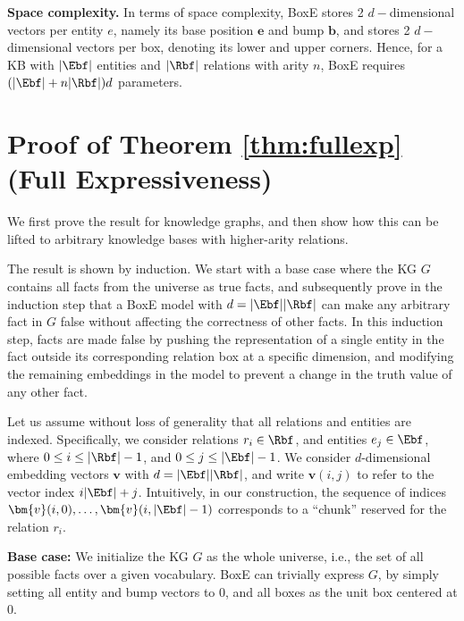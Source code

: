 \documentclass{article}
\begin{document}
\textbf{Space complexity.} In terms of space complexity, BoxE stores 2 $d-$dimensional vectors per entity $e$, namely its base position $\bm{e}$ and bump $\bm{b}$, and stores 2 $d-$dimensional vectors per box, denoting its lower and upper corners. Hence, for a KB with $|\Ebf|$ entities and $|\Rbf|$ relations with arity $n$, BoxE requires $(|\Ebf| + n|\Rbf|)d$ parameters.


\section{Proof of Theorem \ref{thm:fullexp} (Full Expressiveness)}
\label{app:fullExp}
We first prove the result for knowledge graphs, and then show how this can be lifted to arbitrary knowledge bases with higher-arity relations.


The result is shown by induction. We start with a base case where the KG $G$ contains all facts from  the universe as true facts, and subsequently prove in the induction step that a BoxE model with $d = |\Ebf||\Rbf|$ can make any arbitrary fact in $G$ false without affecting the correctness of other facts. In this induction step, facts are made false by pushing the representation of a single entity in the fact outside its corresponding relation box at a specific dimension, and modifying the remaining embeddings in the model to prevent a change in the truth value of any other fact. 


Let us assume without loss of generality that all relations and entities are indexed. Specifically, we consider relations $r_i \in \Rbf$, and entities $e_j \in \Ebf$, where $0\leq i \leq |\Rbf|-1$, and $0\leq j \leq |\Ebf|-1$.
We consider $d$-dimensional embedding vectors $\bm{v}$ with $d = |\Ebf||\Rbf|$, and write $\bm{v}(i,j)$ to refer to the vector index $i|\Ebf|+j$.
Intuitively, in our construction, the sequence of indices $\bm{v}(i,0), \ldots, \bm{v}(i,|\Ebf|-1)$  corresponds to 
a ``chunk'' reserved for the relation $r_i$.

\textbf{Base case: } We initialize the KG $G$ as the whole universe, i.e., the set of all possible facts over a given vocabulary. BoxE can trivially express $G$, by simply setting all entity and bump vectors to $0$, and all boxes as the unit box centered at $0$.
\end{document}
